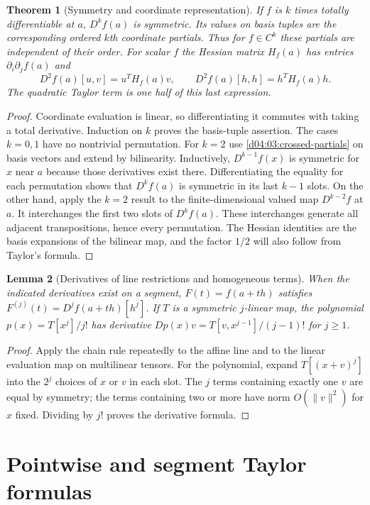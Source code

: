 \documentclass[11pt,oneside,openany]{book}
\newtheorem{theorem}{Theorem}[chapter]
\newtheorem{lemma}[theorem]{Lemma}
\theoremstyle{definition}
\theoremstyle{remark}
\newcommand{\norm}[1]{\lVert#1\rVert}
\newcommand{\family}[1]{}
\begin{document}
\begin{theorem}[Symmetry and coordinate representation]\label{d04:03:symmetry}
If $f$ is $k$ times totally differentiable at $a$, $D^kf(a)$ is symmetric.
Its values on basis tuples are the corresponding ordered $k$th coordinate
partials. Thus for $f\in C^k$ these partials are independent of their order.
For scalar $f$ the Hessian matrix $H_f(a)$ has entries
$\partial_i\partial_jf(a)$ and
\[
 D^2f(a)[u,v]=u^TH_f(a)v,\qquad
 D^2f(a)[h,h]=h^TH_f(a)h.
\]
The quadratic Taylor term is one half of this last expression.
\end{theorem}
\begin{proof}
Coordinate evaluation is linear, so differentiating it commutes with taking
a total derivative. Induction on $k$ proves the basis-tuple assertion.
The cases $k=0,1$ have no nontrivial permutation. For $k=2$ use
\cref{d04:03:crossed-partials} on basis vectors and extend by bilinearity.
Inductively, $D^{k-1}f(x)$ is symmetric for $x$ near $a$ because those
derivatives exist there. Differentiating the equality for each permutation
shows that $D^kf(a)$ is symmetric in its last $k-1$ slots. On the other
hand, apply the $k=2$ result to the finite-dimensional valued map
$D^{k-2}f$ at $a$. It interchanges the first two slots of $D^kf(a)$.
These interchanges generate all adjacent transpositions, hence every
permutation. The Hessian identities are the basis expansions of the bilinear
map, and the factor $1/2$ will also follow from Taylor's formula.
\end{proof}

\begin{lemma}[Derivatives of line restrictions and homogeneous terms]\label{d04:03:line-restriction}
When the indicated derivatives exist on a segment,
$F(t)=f(a+th)$ satisfies $F^{(j)}(t)=D^jf(a+th)[h^j]$.
If $T$ is a symmetric $j$-linear map, the polynomial $p(x)=T[x^j]/j!$
has derivative $Dp(x)v=T[v,x^{j-1}]/(j-1)!$ for $j\geq1$.
\end{lemma}
\begin{proof}
Apply the chain rule repeatedly to the affine line and to the linear
evaluation map on multilinear tensors. For the polynomial, expand
$T[(x+v)^j]$ into the $2^j$ choices of $x$ or $v$ in each slot.
The $j$ terms containing exactly one $v$ are equal by symmetry; the terms
containing two or more have norm $O(\norm{v}^2)$ for $x$ fixed. Dividing
by $j!$ proves the derivative formula.
\end{proof}

\section{Pointwise and segment Taylor formulas}
\family{K04.03.05}\family{K04.03.06}\family{K04.03.10}
\end{document}
